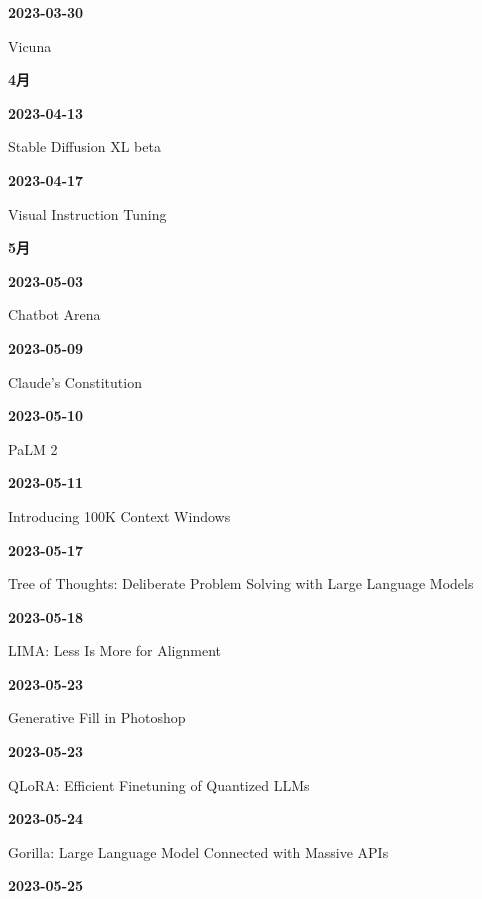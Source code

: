 \smallskip
\noindent\textbf{2023-03-30}\par
{\raggedright Vicuna\,\cite{chron-b9520efca708}\par}
\smallskip
\medskip
\noindent\textbf{4月}\par
\smallskip
\noindent\textbf{2023-04-13}\par
{\raggedright Stable Diffusion XL beta\,\cite{src-091bbe9dbf4e}\par}
\smallskip
\noindent\textbf{2023-04-17}\par
{\raggedright Visual Instruction Tuning\,\cite{chron-110bc8494fd2}\par}
\smallskip
\medskip
\noindent\textbf{5月}\par
\smallskip
\noindent\textbf{2023-05-03}\par
{\raggedright Chatbot Arena\,\cite{src-b2d10cbd609c}\par}
\smallskip
\noindent\textbf{2023-05-09}\par
{\raggedright Claude's Constitution\,\cite{src-8f63dfa1697f}\par}
\smallskip
\noindent\textbf{2023-05-10}\par
{\raggedright PaLM 2\,\cite{src-e116708067ab}\par}
\smallskip
\noindent\textbf{2023-05-11}\par
{\raggedright Introducing 100K Context Windows\,\cite{src-b1525886b462}\par}
\smallskip
\noindent\textbf{2023-05-17}\par
{\raggedright Tree of Thoughts: Deliberate Problem Solving with Large Language Models\,\cite{src-8a38211129c4}\par}
\smallskip
\noindent\textbf{2023-05-18}\par
{\raggedright LIMA: Less Is More for Alignment\,\cite{chron-b46e12bcba8f}\par}
\smallskip
\noindent\textbf{2023-05-23}\par
{\raggedright Generative Fill in Photoshop\,\cite{src-a4f61fbe35c5}\par}
\smallskip
\noindent\textbf{2023-05-23}\par
{\raggedright QLoRA: Efficient Finetuning of Quantized LLMs\,\cite{src-7f830e688335}\par}
\smallskip
\noindent\textbf{2023-05-24}\par
{\raggedright Gorilla: Large Language Model Connected with Massive APIs\,\cite{chron-271199ae1a01}\par}
\smallskip
\noindent\textbf{2023-05-25}\par
